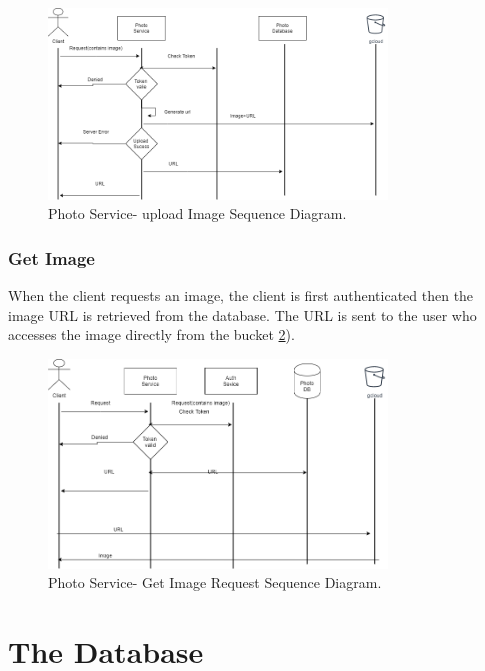 \begin{figure}
	\begin{center}
		\includegraphics[width=90mm,scale=1]{img/photos/upload-image-sequence.png}
		\caption{Photo Service- upload Image Sequence Diagram.}
		\label{photo:uploadsequence}
	\end{center}
\end{figure}


\subsubsection{Get Image}

When the client requests an image, the client is first authenticated then the image URL is retrieved from the database. The URL is sent to the user who accesses the image directly from the bucket \ref{photo:getsequence}).

\begin{figure}
	\begin{center}
		\includegraphics[width=90mm,scale=1]{img/photos/Image-request.png}
		\caption{Photo Service- Get Image Request Sequence Diagram.}
		\label{photo:getsequence}
	\end{center}
\end{figure}

\section{The Database}

